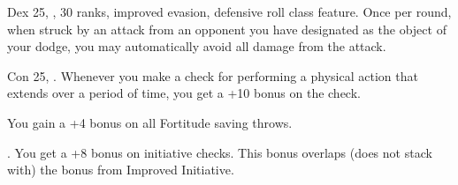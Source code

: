 {Dex 25, ,  30 ranks, improved evasion, defensive roll class feature.}
{Once per round, when struck by an attack from an opponent you have designated as the object of your dodge, you may automatically avoid all damage from the attack.}

{Con 25, .}
{Whenever you make a check for performing a physical action that extends over a period of time, you get a +10 bonus on the check.}

{}{You gain a +4 bonus on all Fortitude saving throws.}

{.}
{You get a +8 bonus on initiative checks. This bonus overlaps (does not stack with) the bonus from Improved Initiative.}

